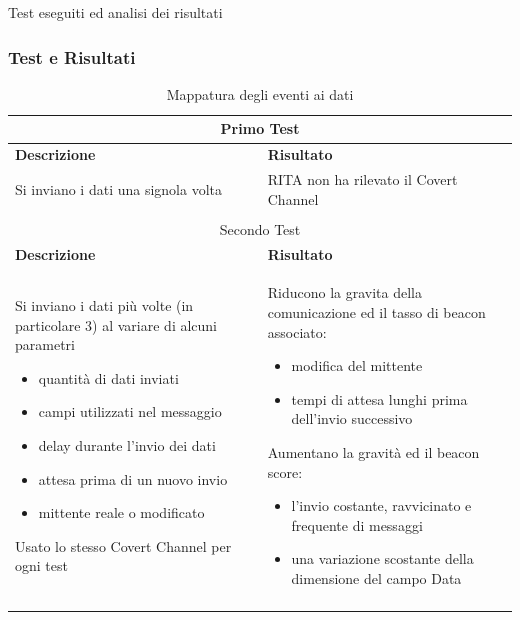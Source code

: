\begin{frame}
\vfill
\begin{center}
{\huge Test eseguiti ed analisi dei risultati}
\end{center}
\vfill 
\end{frame}
\begin{frame} [fragile]
\frametitle{Test e Risultati}  
\scriptsize 
\begin{longtable}{|p{}|p{}|}
    \multicolumn{2}{c}{Primo Test} \\ \hline 
    \textbf{Descrizione} & \textbf{Risultato} \\ \hline 
    Si inviano i dati una signola volta & RITA non ha rilevato il Covert Channel \\ \hline 
    \multicolumn{2}{c}{} \\[2ex] 
    \multicolumn{2}{c}{Secondo Test} \\ \hline 
    \textbf{Descrizione} & \textbf{Risultato} \\ \hline 
    Si inviano i dati più volte (in particolare 3) al variare di alcuni parametri\par 
    \begin{itemize}
    \item quantità di dati inviati
    \item campi utilizzati nel messaggio
    \item delay durante l'invio dei dati 
    \item attesa prima di un nuovo invio
    \item mittente reale o modificato
    \end{itemize}
    Usato lo stesso Covert Channel per ogni test
    & 
    Riducono la gravita della comunicazione ed il tasso di beacon associato: 
    \begin{itemize}
    \item modifica del mittente 
    \item tempi di attesa lunghi prima dell'invio successivo  
    \end{itemize} 
    \vspace{1ex} 
    Aumentano la gravità ed il beacon score: 
    \begin{itemize}
    \item l'invio costante, ravvicinato e frequente di messaggi 
    \item una variazione scostante della dimensione del campo Data
    \end{itemize} 
    \\ \hline 
    \caption{Mappatura degli eventi ai dati}  
\end{longtable} 
\end{frame} 
